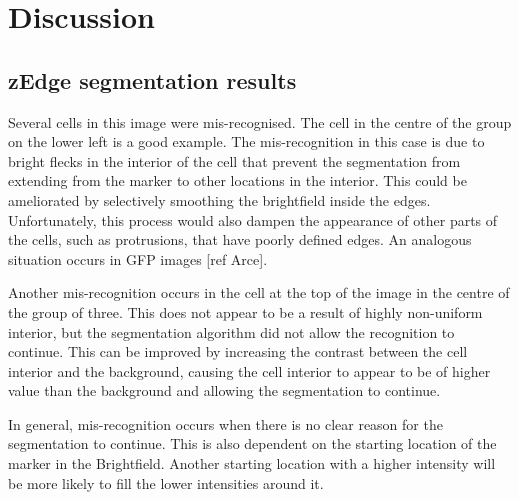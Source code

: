 
\chapter{Discussion}

\ifpdf
    \graphicspath{{Chapter7/Figs/Raster/}{Chapter7/Figs/PDF/}{Chapter7/Figs/}}
\else
    \graphicspath{{Chapter7/Figs/Vector/}{Chapter7/Figs/}}
\fi

\section{zEdge segmentation results}


Several cells in this image were mis-recognised. The cell in the centre of the group on the lower left is a good example. The mis-recognition in this case is due to bright flecks in the interior of the cell that prevent the segmentation from extending from the marker to other locations in the interior. This could be ameliorated by selectively smoothing the brightfield inside the edges. Unfortunately, this process would also dampen the appearance of other parts of the cells, such as protrusions, that have poorly defined edges. An analogous situation occurs in GFP images [ref Arce].

Another mis-recognition occurs in the cell at the top of the image in the centre of the group of three. This does not appear to be a result of highly non-uniform interior, but the segmentation algorithm did not allow the recognition to continue. This can be improved by increasing the contrast between the cell interior and the background, causing the cell interior to appear to be of higher value than the background and allowing the segmentation to continue.

In general, mis-recognition occurs when there is no clear reason for the segmentation to continue. This is also dependent on the starting location of the marker in the Brightfield. Another starting location with a higher intensity will be more likely to fill the lower intensities around it.

